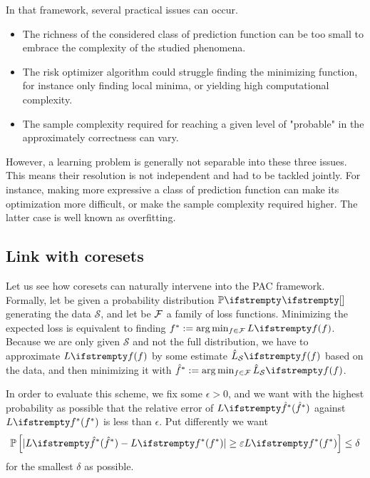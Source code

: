 In that framework, several practical issues can occur. 
\begin{itemize}
    \item The richness of the considered class of prediction function can be too small to embrace the complexity of the studied phenomena.
    \item The risk optimizer algorithm could struggle finding the minimizing function, for instance only finding local minima, or yielding high computational complexity.
    \item The sample complexity required for reaching a given level of "probable" in the approximately correctness can vary.
\end{itemize}

However, a learning problem is generally not separable into these three issues. This means their resolution is not independent and had to be tackled jointly. For instance, making more expressive a class of prediction function can make its optimization more difficult, or make the sample complexity required higher. The latter case is well known as overfitting.

\subsection{Link with coresets}

Let us see how coresets can naturally intervene into the PAC framework. Formally, let be given a probability distribution $\PP{}{}$ generating the data $\mathcal{S}$, and let be $\mathcal{F}$ a family of loss functions. Minimizing the expected loss is equivalent to finding $\query^*:= \arg \min_{\query \in \qset} \loss{\query}$. Because we are only given $\mathcal{S}$ and not the full distribution, we have to approximate $\loss{\query}$ by some estimate $\estloss{\mathcal{S}}{\query}$ based on the data, and then minimizing it with $\hat{\query}^* := \arg \min_{\query\in \qset} \estloss{\mathcal{S}}{\query}$. 


In order to evaluate this scheme, we fix some $\epsilon>0$, and we want with the highest probability as possible that the relative error of $\loss{\hat\query^*}$ against $\loss{\query^*}$ is less than $\epsilon$. Put differently we want
\begin{equation*}
	\mathbb{P}\left[|\loss{\hat\query^*} - \loss{\query^*}| \ge \epsilon \loss{\query^*}\right] \leq \delta
\end{equation*}
for the smallest $\delta$ as possible.

